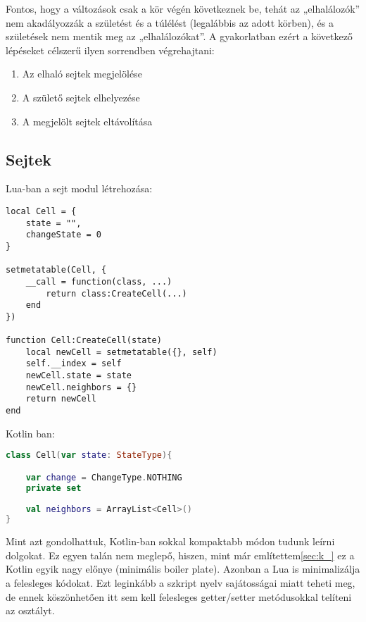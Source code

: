Fontos, hogy a változások csak a kör végén következnek be, tehát az „elhalálozók” nem akadályozzák a születést és a túlélést (legalábbis az adott körben), és a születések nem mentik meg az „elhalálozókat”. A gyakorlatban ezért a következő lépéseket célszerű ilyen sorrendben végrehajtani:
\begin{enumerate}
	\item Az elhaló sejtek megjelölése
	\item A születő sejtek elhelyezése
	\item A megjelölt sejtek eltávolítása
\end{enumerate}

\subsection{Sejtek}

Lua-ban a sejt modul létrehozása:
\scriptsize
\begin{lstlisting}[style=Lua]
local Cell = {
	state = "",
	changeState = 0
}

setmetatable(Cell, {
	__call = function(class, ...)
		return class:CreateCell(...)
	end
})

function Cell:CreateCell(state)
	local newCell = setmetatable({}, self)
	self.__index = self
	newCell.state = state
	newCell.neighbors = {}
	return newCell
end
\end{lstlisting}
\normalsize
Kotlin ban:
\scriptsize
\begin{lstlisting}[language = Kotlin]
class Cell(var state: StateType){

	var change = ChangeType.NOTHING
	private set
	
	val neighbors = ArrayList<Cell>()
}
\end{lstlisting}
\normalsize
Mint azt gondolhattuk, Kotlin-ban sokkal kompaktabb módon tudunk leírni dolgokat. Ez egyen talán nem meglepő, hiszen, mint már említettem\ref{sec:k_} ez a Kotlin egyik nagy előnye (minimális boiler plate). Azonban a Lua is minimalizálja a felesleges kódokat. Ezt leginkább a szkript nyelv sajátosságai miatt teheti meg, de ennek köszönhetően itt sem kell felesleges getter/setter metódusokkal telíteni az osztályt.

\newpage

